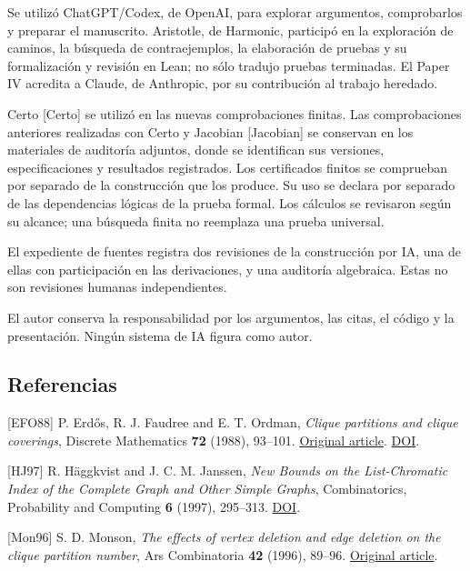 \documentclass[spanish,11pt,a4paper]{article}
\begin{document}
Se utilizó ChatGPT/Codex, de OpenAI, para explorar argumentos,
comprobarlos y preparar el manuscrito. Aristotle, de Harmonic, participó
en la exploración de caminos, la búsqueda de contraejemplos, la
elaboración de pruebas y su formalización y revisión en Lean; no sólo
tradujo pruebas terminadas. El Paper IV acredita a Claude, de Anthropic,
por su contribución al trabajo heredado.

Certo {[}Certo{]} se utilizó en las nuevas comprobaciones finitas. Las
comprobaciones anteriores realizadas con Certo y Jacobian {[}Jacobian{]}
se conservan en los materiales de auditoría adjuntos, donde se
identifican sus versiones, especificaciones y resultados registrados.
Los certificados finitos se comprueban por separado de la construcción
que los produce. Su uso se declara por separado de las dependencias
lógicas de la prueba formal. Los cálculos se revisaron según su alcance;
una búsqueda finita no reemplaza una prueba universal.

El expediente de fuentes registra dos revisiones de la construcción por
IA, una de ellas con participación en las derivaciones, y una auditoría
algebraica. Estas no son revisiones humanas independientes.

El autor conserva la responsabilidad por los argumentos, las citas, el
código y la presentación. Ningún sistema de IA figura como autor.

\subsection{Referencias}\label{referencias}

{[}EFO88{]} P. Erdős, R. J. Faudree and E. T. Ordman, \emph{Clique
partitions and clique coverings}, Discrete Mathematics \textbf{72}
(1988), 93--101.
\href{https://www.renyi.hu/~p_erdos/1988-04.pdf}{Original article}.
\href{https://doi.org/10.1016/0012-365X(88)90197-5}{DOI}.

{[}HJ97{]} R. Häggkvist and J. C. M. Janssen, \emph{New Bounds on the
List-Chromatic Index of the Complete Graph and Other Simple Graphs},
Combinatorics, Probability and Computing \textbf{6} (1997), 295--313.
\href{https://doi.org/10.1017/S0963548397002927}{DOI}.

{[}Mon96{]} S. D. Monson, \emph{The effects of vertex deletion and edge
deletion on the clique partition number}, Ars Combinatoria \textbf{42}
(1996), 89--96.
\href{https://combinatorialpress.com/article/ars/Volume\%20042/volume-42-paper-6.pdf}{Original
article}.
\end{document}
